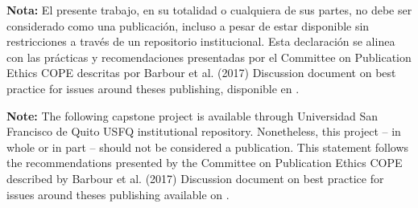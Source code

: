 \begingroup\dobleesp
\vspace{6pt}
\textbf{Nota:} El presente trabajo, en su totalidad o cualquiera de sus partes, no debe ser considerado como una publicación, incluso a pesar de estar disponible sin restricciones a través de un repositorio institucional. Esta declaración se alinea con las prácticas y recomendaciones presentadas por el Committee on Publication Ethics COPE descritas por Barbour et al. (2017) Discussion document on best practice for issues around theses publishing, disponible en .
\par
\endgroup
{}
\begingroup\dobleesp
\vspace{6pt}
\textbf{Note:} The following capstone project is available through Universidad San Francisco de Quito USFQ institutional repository. Nonetheless, this project -- in whole or in part -- should not be considered a publication. This statement follows the recommendations presented by the Committee on Publication Ethics COPE described by Barbour et al. (2017) Discussion document on best practice for issues around theses publishing available on .
\par
\endgroup
